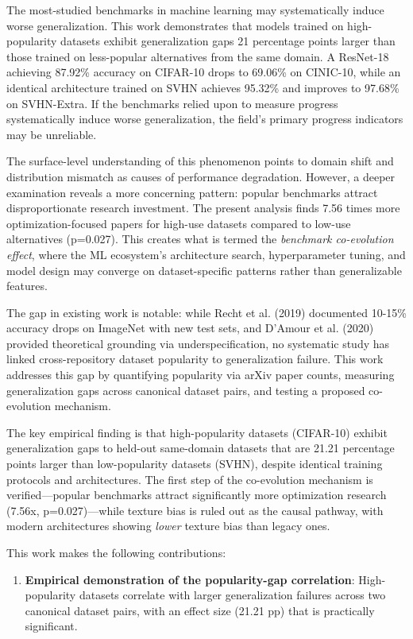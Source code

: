 
The most-studied benchmarks in machine learning may systematically induce worse generalization. This work demonstrates that models trained on high-popularity datasets exhibit generalization gaps 21 percentage points larger than those trained on less-popular alternatives from the same domain. A ResNet-18 achieving 87.92\% accuracy on CIFAR-10 drops to 69.06\% on CINIC-10, while an identical architecture trained on SVHN achieves 95.32\% and improves to 97.68\% on SVHN-Extra. If the benchmarks relied upon to measure progress systematically induce worse generalization, the field's primary progress indicators may be unreliable.

The surface-level understanding of this phenomenon points to domain shift and distribution mismatch as causes of performance degradation. However, a deeper examination reveals a more concerning pattern: popular benchmarks attract disproportionate research investment. The present analysis finds 7.56 times more optimization-focused papers for high-use datasets compared to low-use alternatives (p=0.027). This creates what is termed the \textit{benchmark co-evolution effect}, where the ML ecosystem's architecture search, hyperparameter tuning, and model design may converge on dataset-specific patterns rather than generalizable features.

The gap in existing work is notable: while Recht et al. (2019) documented 10-15\% accuracy drops on ImageNet with new test sets, and D'Amour et al. (2020) provided theoretical grounding via underspecification, no systematic study has linked cross-repository dataset popularity to generalization failure. This work addresses this gap by quantifying popularity via arXiv paper counts, measuring generalization gaps across canonical dataset pairs, and testing a proposed co-evolution mechanism.

The key empirical finding is that high-popularity datasets (CIFAR-10) exhibit generalization gaps to held-out same-domain datasets that are 21.21 percentage points larger than low-popularity datasets (SVHN), despite identical training protocols and architectures. The first step of the co-evolution mechanism is verified---popular benchmarks attract significantly more optimization research (7.56x, p=0.027)---while texture bias is ruled out as the causal pathway, with modern architectures showing \textit{lower} texture bias than legacy ones.

This work makes the following contributions:

\begin{enumerate}
\item \textbf{Empirical demonstration of the popularity-gap correlation}: High-popularity datasets correlate with larger generalization failures across two canonical dataset pairs, with an effect size (21.21 pp) that is practically significant.
\end{enumerate}

